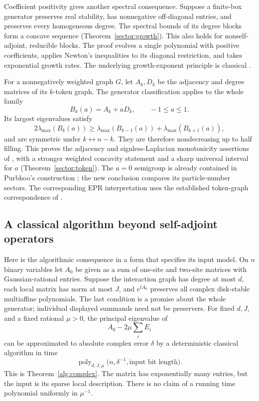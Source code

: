 \documentclass[reqno]{amsart}
\theoremstyle{definition}
\theoremstyle{remark}
\begin{document}
Coefficient positivity gives another spectral consequence. Suppose a
finite-box generator preserves real stability, has nonnegative
off-diagonal entries, and preserves every homogeneous degree.
The spectral bounds of its degree blocks form a concave sequence
(Theorem~\ref{sector:growth}). This also holds for nonself-adjoint,
reducible blocks. The proof evolves a single polynomial with positive
coefficients, applies Newton's inequalities to its diagonal restriction,
and takes exponential growth rates. The underlying growth-exponent
principle is classical \cite{Branden10Discrete}.

For a nonnegatively weighted graph \(G\), let \(A_k,D_k\) be the
adjacency and degree matrices of its \(k\)-token graph. The generator
classification applies to the whole family
\[
 B_k(a)=A_k+aD_k,\qquad -1\le a\le1.
\]
Its largest eigenvalues satisfy
\[
 2\lambda_{\max}(B_k(a))
 \ge\lambda_{\max}(B_{k-1}(a))+\lambda_{\max}(B_{k+1}(a)),
\]
and are symmetric under \(k\leftrightarrow n-k\).
They are therefore nondecreasing up to half filling. This proves
the adjacency and signless-Laplacian monotonicity assertions of
\cite[Conjectures~5--6]{APS26}, with a stronger weighted concavity
statement and a sharp universal interval for \(a\)
(Theorem~\ref{sector:token}).
The \(a=0\) semigroup is already contained in Purbhoo's construction
\cite{Purbhoo18}; the new conclusion compares its particle-number
sectors. The corresponding EPR interpretation uses the established
token-graph correspondence of \cite{APS26}.

\subsection{A classical algorithm beyond self-adjoint operators}

Here is the algorithmic consequence in a form that specifies its input
model. On $n$ binary variables let $A_0$ be given as a sum of one-site
and two-site matrices with Gaussian-rational entries. Suppose the
interaction graph has degree at most $d$, each local matrix has norm
at most $J$, and $e^{tA_0}$ preserves all complex disk-stable
multiaffine polynomials. The last condition is a promise about the
whole generator; individual displayed summands need not be preservers.
For fixed $d,J$, and a fixed rational $\mu>0$, the principal eigenvalue of
\[
 A_0-2\mu\sum_iE_i
\]
can be approximated to absolute complex error $\delta$ by a deterministic
classical algorithm in time
\[
 \operatorname{poly}_{d,J,\mu}
       \bigl(n,\delta^{-1},\text{input bit length}\bigr).
\]
This is Theorem~\ref{alg:complex}. The matrix has exponentially many
entries, but the input is its sparse local description. There is no
claim of a running time polynomial uniformly in $\mu^{-1}$.
\end{document}
